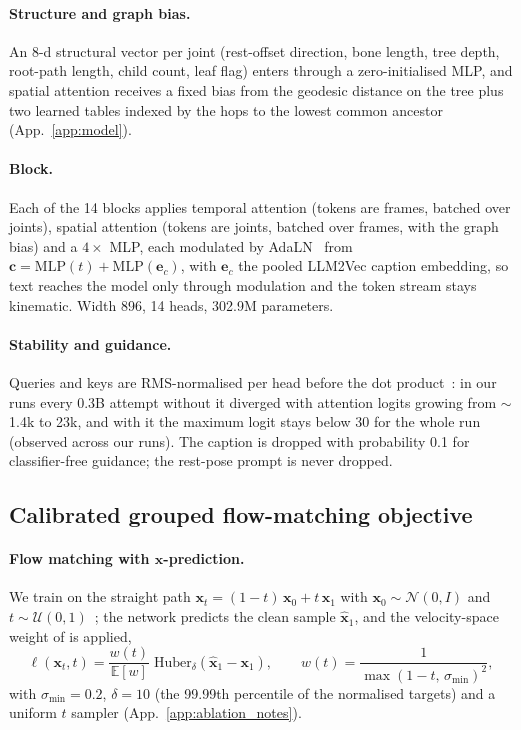 \paragraph{Structure and graph bias.} An 8-d structural vector per joint (rest-offset direction,
bone length, tree depth, root-path length, child count, leaf flag) enters through a zero-initialised
MLP, and spatial attention receives a fixed bias from the geodesic distance on the tree plus two
learned tables indexed by the hops to the lowest common ancestor (App.~\ref{app:model}).

\paragraph{Block.} Each of the 14 blocks applies temporal attention (tokens are frames, batched
over joints), spatial attention (tokens are joints, batched over frames, with the graph bias) and a
$4\times$ MLP, each modulated by AdaLN~\citep{peebles2023dit} from
$\mathbf{c}=\mathrm{MLP}(t)+\mathrm{MLP}(\mathbf{e}_c)$, with $\mathbf{e}_c$ the pooled LLM2Vec caption
embedding, so text reaches the model only through modulation and the token stream stays kinematic.
Width 896, 14 heads, \num{302.9}M parameters.

\paragraph{Stability and guidance.} Queries and keys are RMS-normalised per head before the dot
product~\citep{dehghani2023vit22b}: in our runs every 0.3B attempt without it diverged with
attention logits growing from $\sim$1.4k to 23k, and with it the maximum logit stays below 30 for
the whole run (observed across our runs). The caption is dropped with
probability 0.1 for classifier-free guidance; the rest-pose prompt is never dropped.

\subsection{Calibrated grouped flow-matching objective}\label{sec:method:objective}

\paragraph{Flow matching with $\mathbf{x}$-prediction.} We train on the straight path
$\mathbf{x}_t=(1-t)\,\mathbf{x}_0+t\,\mathbf{x}_1$ with $\mathbf{x}_0\sim\mathcal{N}(0,I)$ and
$t\sim\mathcal{U}(0,1)$~\citep{lipman2023flow,liu2023rectified}; the network predicts the clean
sample $\hat{\mathbf{x}}_1$, and the velocity-space weight of \citet{li2025jit} is applied,
\begin{equation}
  \ell(\mathbf{x}_t,t)=\frac{w(t)}{\mathbb{E}[w]}\;\mathrm{Huber}_{\delta}\!\left(\hat{\mathbf{x}}_1-\mathbf{x}_1\right),
  \qquad w(t)=\frac{1}{\max(1-t,\,\sigma_{\min})^{2}},
  \label{eq:elem}
\end{equation}
with $\sigma_{\min}=0.2$, $\delta=10$ (the 99.99th percentile of the normalised targets) and a
uniform $t$ sampler (App.~\ref{app:ablation_notes}).

